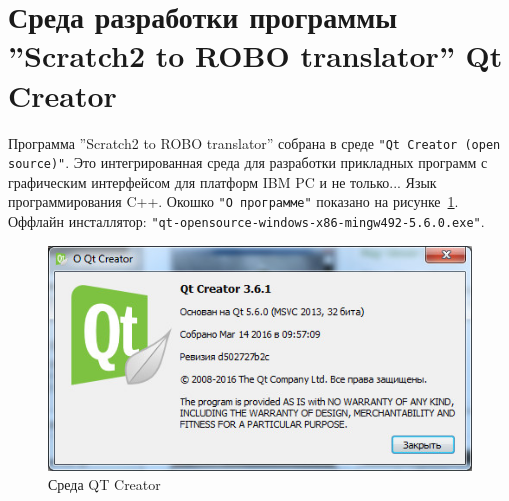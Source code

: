 \section{Среда разработки программы ''Scratch2 to ROBO translator'' Qt Creator}
Программа ''Scratch2 to ROBO translator'' собрана в среде \verb|"Qt Creator (open source)"|. Это интегрированная среда для разработки прикладных программ с графическим интерфейсом для платформ IBM PC и не только... Язык программирования C++. Окошко \verb|"О программе"| показано на рисунке~\ref{p:pic_about_qt}. Оффлайн инсталлятор: \verb|"qt-opensource-windows-x86-mingw492-5.6.0.exe"|.

\begin{figure}[H]\center
  \captionsetup{singlelinecheck=true} %
  \includegraphics*[scale=0.7]{about/images/about_qt}
  \caption{Среда QT Creator} \label{p:pic_about_qt}
\end{figure}
